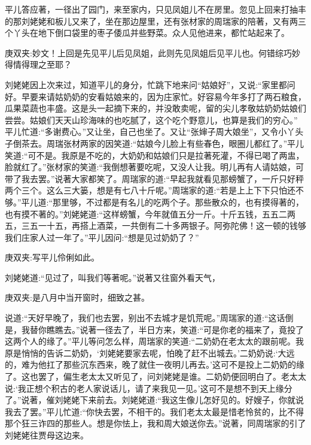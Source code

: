 \begin{parag}
    平儿答应著，一径出了园门，来至家内，只见凤姐儿不在房里。忽见上回来打抽丰的那刘姥姥和板儿又来了，坐在那边屋里，还有张材家的周瑞家的陪著，又有两三个丫头在地下倒口袋里的枣子倭瓜并些野菜。众人见他进来，都忙站起来了。\begin{note}庚双夹:妙文！上回是先见平儿后见凤姐，此则先见凤姐后见平儿也。何错综巧妙得情得理之至耶？\end{note}刘姥姥因上次来过，知道平儿的身分，忙跳下地来问“姑娘好”，又说:“家里都问好。早要来请姑奶奶的安看姑娘来的，因为庄家忙。好容易今年多打了两石粮食，瓜果菜蔬也丰盛。这是头一起摘下来的，并没敢卖呢，留的尖儿孝敬姑奶奶姑娘们尝尝。姑娘们天天山珍海味的也吃腻了，这个吃个野意儿，也算是我们的穷心。” 平儿忙道:“多谢费心。”又让坐，自己也坐了。又让“张婶子周大娘坐”，又令小丫头子倒茶去。周瑞张材两家的因笑道:“姑娘今儿脸上有些春色，眼圈儿都红了。”平儿笑道:“可不是。我原是不吃的，大奶奶和姑娘们只是拉著死灌，不得已喝了两盅，脸就红了。”张材家的笑道:“我倒想著要吃呢，又没人让我。明儿再有人请姑娘，可带了我去罢。”说著大家都笑了。周瑞家的道:“早起我就看见那螃蟹了，一斤只好秤两个三个。这么三大篓，想是有七八十斤呢。”周瑞家的道:“若是上上下下只怕还不够。”平儿道:“那里够，不过都是有名儿的吃两个子。那些散众的，也有摸得著的，也有摸不著的。”刘姥姥道:“这样螃蟹，今年就值五分一斤。十斤五钱，五五二两五，三五一十五，再搭上酒菜，一共倒有二十多两银子。阿弥陀佛！这一顿的钱够我们庄家人过一年了。”平儿因问:“想是见过奶奶了？”\begin{note}庚双夹:写平儿伶俐如此。\end{note}刘姥姥道:“见过了，叫我们等著呢。”说著又往窗外看天气，\begin{note}庚双夹:是八月中当开窗时，细致之甚。\end{note}说道:“天好早晚了，我们也去罢，别出不去城才是饥荒呢。”周瑞家的道:“这话倒是，我替你瞧瞧去。”说著一径去了，半日方来，笑道:“可是你老的福来了，竟投了这两个人的缘了。”平儿等问怎么样，周瑞家的笑道:“二奶奶在老太太的跟前呢。我原是悄悄的告诉二奶奶，‘刘姥姥要家去呢，怕晚了赶不出城去。’二奶奶说:‘大远的，难为他扛了那些沉东西来，晚了就住一夜明儿再去。’这可不是投上二奶奶的缘了。这也罢了，偏生老太太又听见了，问刘姥姥是谁。二奶奶便回明白了。老太太说:‘我正想个积古的老人家说话儿，请了来我见一见。’这可不是想不到天上缘分了。”说著，催刘姥姥下来前去。刘姥姥道:“我这生像儿怎好见的。好嫂子，你就说我去了罢。”平儿忙道:“你快去罢，不相干的。我们老太太最是惜老怜贫的，比不得那个狂三诈四的那些人。想是你怯上，我和周大娘送你去。”说著，同周瑞家的引了刘姥姥往贾母这边来。
\end{parag}


